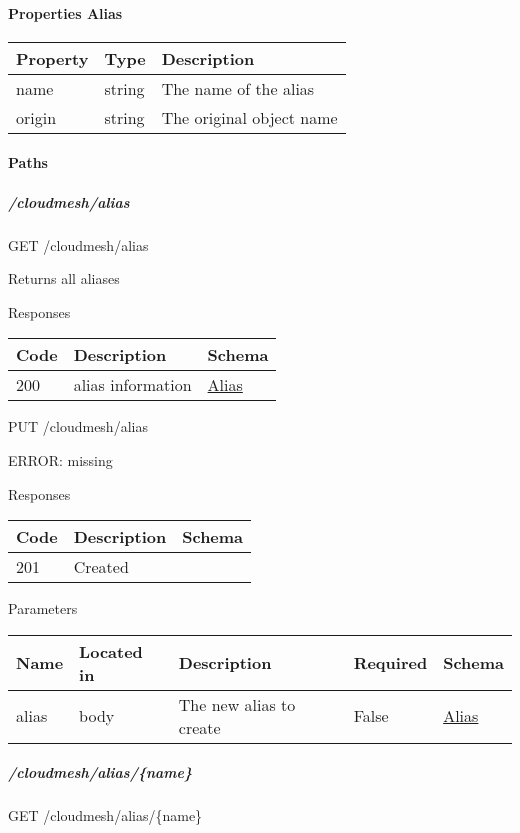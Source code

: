 \documentclass[9pt,]{article}
\let\oldparagraph\paragraph
\renewcommand{\paragraph}[1]{\oldparagraph{#1}\mbox{}}
\let\oldsubparagraph\subparagraph
\renewcommand{\subparagraph}[1]{\oldsubparagraph{#1}\mbox{}}
\begin{document}
\hypertarget{properties-alias}{%
\paragraph{Properties Alias}\label{properties-alias}}

\begin{longtable}[]{@{}lll@{}}
\toprule
Property & Type & Description\tabularnewline
\midrule
\endhead
name & string & The name of the alias\tabularnewline
origin & string & The original object name\tabularnewline
\bottomrule
\end{longtable}

\hypertarget{paths-4}{%
\paragraph{Paths}\label{paths-4}}

\hypertarget{cloudmeshalias}{%
\subparagraph{/cloudmesh/alias}\label{cloudmeshalias}}

GET /cloudmesh/alias

Returns all aliases

Responses

\begin{longtable}[]{@{}lll@{}}
\toprule
Code & Description & Schema\tabularnewline
\midrule
\endhead
200 & alias information &
\protect\hyperlink{alias}{Alias}\tabularnewline
\bottomrule
\end{longtable}

PUT /cloudmesh/alias

ERROR: missing

Responses

\begin{longtable}[]{@{}lll@{}}
\toprule
Code & Description & Schema\tabularnewline
\midrule
\endhead
201 & Created &\tabularnewline
\bottomrule
\end{longtable}

Parameters

\begin{longtable}[]{@{}lllll@{}}
\toprule
Name & Located in & Description & Required & Schema\tabularnewline
\midrule
\endhead
alias & body & The new alias to create & False &
\protect\hyperlink{alias}{Alias}\tabularnewline
\bottomrule
\end{longtable}

\hypertarget{cloudmeshaliasname}{%
\subparagraph{/cloudmesh/alias/\{name\}}\label{cloudmeshaliasname}}

GET /cloudmesh/alias/\{name\}
\end{document}
